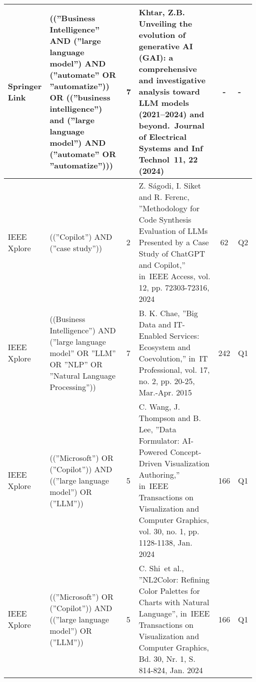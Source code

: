 \begin{scriptsize}
\begin{longtable}{|p{1cm}|p{3cm}|C{1.1cm}|p{4cm}|c|C{1.2cm}|}
    \hline
    Springer Link & ((''Business Intelligence'' AND (''large language model'') AND (''automate'' OR ''automatize'')) OR ((''business intelligence'') and (''large language model'') AND (''automate'' OR ''automatize''))) & 7 & Khtar, Z.B. Unveiling the evolution of generative AI (GAI): a comprehensive and investigative analysis toward LLM models (2021–2024) and beyond. Journal of Electrical Systems and Inf Technol 11, 22 (2024) & - & - \\
    \hline
    IEEE Xplore & ((''Copilot'') AND (''case study'')) & 2 & Z. Ságodi, I. Siket and R. Ferenc, ''Methodology for Code Synthesis Evaluation of LLMs Presented by a Case Study of ChatGPT and Copilot,'' in IEEE Access, vol. 12, pp. 72303-72316, 2024 & 62 & Q2 \\
    \hline
    IEEE Xplore & ((Business Intelligence'') AND (''large language model'' OR ''LLM'' OR ''NLP'' OR ''Natural Language Processing'')) & 7 & B. K. Chae, ''Big Data and IT-Enabled Services: Ecosystem and Coevolution,'' in IT Professional, vol. 17, no. 2, pp. 20-25, Mar.-Apr. 2015 & 242 & Q1 \\
    \hline
    IEEE Xplore & ((''Microsoft'') OR (''Copilot'')) AND ((''large language model'') OR (''LLM'')) & 5 & C. Wang, J. Thompson and B. Lee, ''Data Formulator: AI-Powered Concept-Driven Visualization Authoring,'' in IEEE Transactions on Visualization and Computer Graphics, vol. 30, no. 1, pp. 1128-1138, Jan. 2024 & 166 & Q1 \\
    \hline
    IEEE Xplore & ((''Microsoft'') OR (''Copilot'')) AND ((''large language model'') OR (''LLM'')) & 5 & C. Shi et al., ''NL2Color: Refining Color Palettes for Charts with Natural Language'', in IEEE Transactions on Visualization and Computer Graphics, Bd. 30, Nr. 1, S. 814-824, Jan. 2024 & 166 & Q1 \\
    \hline
\end{longtable}
\end{scriptsize}

\clearpage